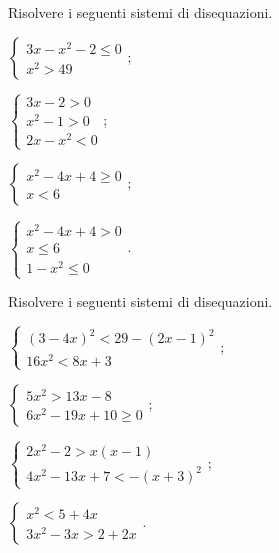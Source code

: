 \begin{esercizio}[\Ast]
 \label{ese:4.73}
Risolvere i seguenti sistemi di disequazioni.
\begin{multicols}{2}
\begin{enumeratea}
\item $\left\{\begin{array}{l}3x-x^2-2\le 0\\x^2>49\end{array}\right.$;
\item $\left\{\begin{array}{l}3x-2>0\\x^2-1>0\\2x-x^2<0\end{array}\right.$;
\item $\left\{\begin{array}{l}x^2-4x+4\ge 0\\x<6\end{array}\right.$;
\item $\left\{\begin{array}{l}x^2-4x+4>0\\x\le 6\\1-x^2\le 0\end{array}\right.$.
\end{enumeratea}
\end{multicols}
\end{esercizio}

\begin{esercizio}[\Ast]
 \label{ese:4.74}
Risolvere i seguenti sistemi di disequazioni.
\begin{multicols}{2}
\begin{enumeratea}
\item $\left\{\begin{array}{l}(3-4x)^{2}<29-(2x-1)^{2}\\16x^{2}<8x+3\end{array}\right.$;
\item $\left\{\begin{array}{l}5x^2>13x-8\\6x^2-19x+10\ge 0\end{array}\right.$;
\item $\left\{\begin{array}{l}2x^2-2>x(x-1)\\4x^2-13x+7<-(x+3)^{2}\end{array}\right.$;
\item $\left\{\begin{array}{l}x^2<5+4x\\3x^{2}-3x>2+2x\end{array}\right.$.
\end{enumeratea}
\end{multicols}
\end{esercizio}

